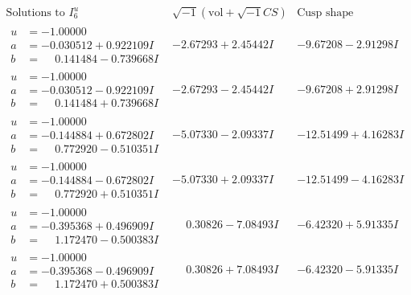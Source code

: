 \documentclass[1p]{elsarticle_modified}
\theoremstyle{definition}
\newcommand{\I}{\sqrt{-1}}
\begin{document}
$$\begin{array}{c|c|c}  
\text{Solutions to }I^u_{6}& \I (\text{vol} + \sqrt{-1}CS) & \text{Cusp shape}\\
 \hline 
\begin{aligned}
u &= -1.00000\phantom{ +0.000000I} \\
a &= -0.030512 + 0.922109 I \\
b &= \phantom{-}0.141484 - 0.739668 I\end{aligned}
 & -2.67293 + 2.45442 I & -9.67208 - 2.91298 I \\ \hline\begin{aligned}
u &= -1.00000\phantom{ +0.000000I} \\
a &= -0.030512 - 0.922109 I \\
b &= \phantom{-}0.141484 + 0.739668 I\end{aligned}
 & -2.67293 - 2.45442 I & -9.67208 + 2.91298 I \\ \hline\begin{aligned}
u &= -1.00000\phantom{ +0.000000I} \\
a &= -0.144884 + 0.672802 I \\
b &= \phantom{-}0.772920 - 0.510351 I\end{aligned}
 & -5.07330 - 2.09337 I & -12.51499 + 4.16283 I \\ \hline\begin{aligned}
u &= -1.00000\phantom{ +0.000000I} \\
a &= -0.144884 - 0.672802 I \\
b &= \phantom{-}0.772920 + 0.510351 I\end{aligned}
 & -5.07330 + 2.09337 I & -12.51499 - 4.16283 I \\ \hline\begin{aligned}
u &= -1.00000\phantom{ +0.000000I} \\
a &= -0.395368 + 0.496909 I \\
b &= \phantom{-}1.172470 - 0.500383 I\end{aligned}
 & \phantom{-}0.30826 - 7.08493 I & -6.42320 + 5.91335 I \\ \hline\begin{aligned}
u &= -1.00000\phantom{ +0.000000I} \\
a &= -0.395368 - 0.496909 I \\
b &= \phantom{-}1.172470 + 0.500383 I\end{aligned}
 & \phantom{-}0.30826 + 7.08493 I & -6.42320 - 5.91335 I \\ \hline\begin{aligned}

\end{aligned}
\end{array}$$
\end{document}

